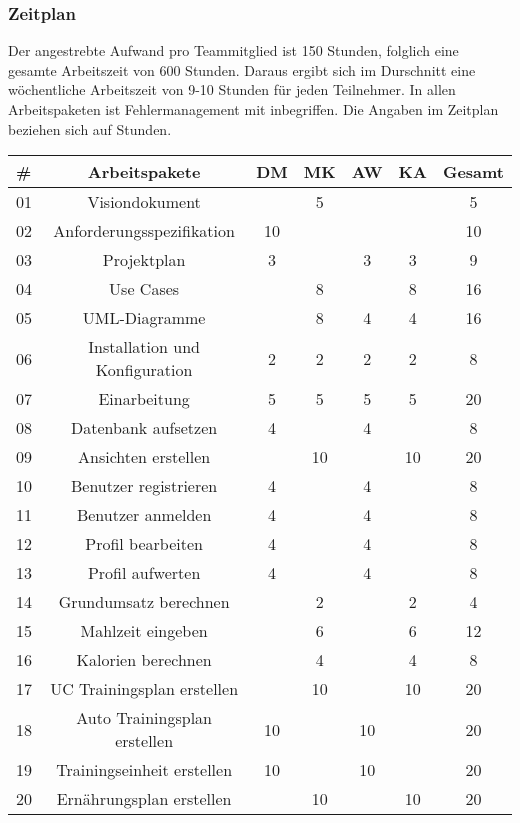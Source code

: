 \documentclass[12pt,a4paper,onecolumn]{article}
\begin{document}
\subsubsection{Zeitplan}
Der angestrebte Aufwand pro Teammitglied ist 150 Stunden, folglich eine gesamte Arbeitszeit von 600 Stunden. Daraus ergibt sich im Durschnitt eine wöchentliche Arbeitszeit von 9-10 Stunden für jeden Teilnehmer. In allen Arbeitspaketen ist Fehlermanagement mit inbegriffen. Die Angaben im Zeitplan beziehen sich auf Stunden.\\
\begin{tabular}{|l|c|c|c|c|c|c|}
\hline
      \textbf{\#} & \textbf{Arbeitspakete} & \textbf{DM} & \textbf{MK} & \textbf{AW} & \textbf{KA} & \textbf{Gesamt} \\
\hline
01 & Visiondokument & & 5 & & & 5\\
\hline
02 & Anforderungsspezifikation & 10 & & & & 10\\
\hline
03 & Projektplan & 3 & & 3 & 3 & 9\\
\hline
04 & Use Cases & & 8 & & 8 & 16 \\
\hline
05 & UML-Diagramme & & 8 & 4 & 4 & 16 \\
\hline
06 & Installation und Konfiguration & 2 & 2 & 2 & 2 & 8\\
\hline
07 & Einarbeitung & 5 & 5 & 5 & 5 & 20\\
\hline
08 & Datenbank aufsetzen & 4 & & 4 & & 8\\
\hline
09 & Ansichten erstellen & & 10 & & 10 & 20\\
\hline
10 & Benutzer registrieren & 4 & & 4 & & 8\\
\hline
11 & Benutzer anmelden & 4 & & 4 & & 8\\
\hline
12 & Profil bearbeiten & 4 & & 4 & & 8\\
\hline
13 & Profil aufwerten & 4 & & 4 & & 8\\
\hline
14 & Grundumsatz berechnen &  & 2 & & 2 & 4\\
\hline
15 & Mahlzeit eingeben & & 6 & & 6 & 12\\
\hline
16 & Kalorien berechnen & & 4 & & 4 & 8\\
\hline
17 & UC Trainingsplan erstellen & & 10 & & 10 & 20\\
\hline
18 & Auto Trainingsplan erstellen & 10 & & 10 & & 20\\
\hline
19 & Trainingseinheit erstellen & 10 &  & 10 &  & 20\\
\hline
20 & Ernährungsplan erstellen & & 10 & & 10 & 20 \\

\end{tabular}
\end{document}
